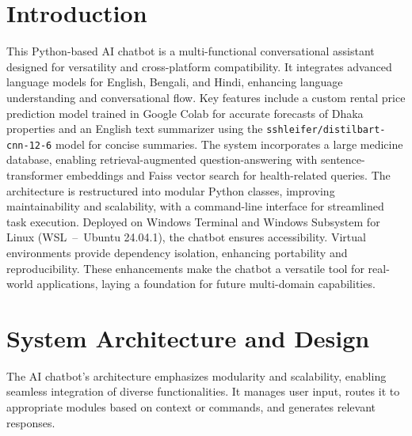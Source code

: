 \documentclass[a4paper,10pt,conference]{IEEEtran}
\begin{document}
\section{Introduction}
This Python-based AI chatbot is a multi-functional conversational assistant designed for versatility and cross-platform compatibility. It integrates advanced language models for English, Bengali, and Hindi, enhancing language understanding and conversational flow. Key features include a custom rental price prediction model trained in Google Colab for accurate forecasts of Dhaka properties and an English text summarizer using the \texttt{sshleifer/distilbart-cnn-12-6} model for concise summaries. The system incorporates a large medicine database, enabling retrieval-augmented question-answering with sentence-transformer embeddings and Faiss vector search for health-related queries. The architecture is restructured into modular Python classes, improving maintainability and scalability, with a command-line interface for streamlined task execution. Deployed on Windows Terminal and Windows Subsystem for Linux (WSL~--~Ubuntu 24.04.1), the chatbot ensures accessibility. Virtual environments provide dependency isolation, enhancing portability and reproducibility. These enhancements make the chatbot a versatile tool for real-world applications, laying a foundation for future multi-domain capabilities.

\section{System Architecture and Design}
The AI chatbot’s architecture emphasizes modularity and scalability, enabling seamless integration of diverse functionalities. It manages user input, routes it to appropriate modules based on context or commands, and generates relevant responses.
\end{document}
